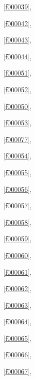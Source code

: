 \noindent\filesourcenumbernameone\ \ref{f000039},\ \pageref{f000039}%

\noindent\filesourcenumbernameone\ \ref{f000042},\ \pageref{f000042}%

\noindent\filesourcenumbernameone\ \ref{f000043},\ \pageref{f000043}%

\noindent\filesourcenumbernameone\ \ref{f000044},\ \pageref{f000044}%

\noindent\filesourcenumbernameone\ \ref{f000051},\ \pageref{f000051}%

\noindent\filesourcenumbernameone\ \ref{f000052},\ \pageref{f000052}%

\noindent\filesourcenumbernameone\ \ref{f000050},\ \pageref{f000050}%

\noindent\filesourcenumbernameone\ \ref{f000053},\ \pageref{f000053}%

\noindent\filesourcenumbernameone\ \ref{f000077},\ \pageref{f000077}%

\noindent\filesourcenumbernameone\ \ref{f000054},\ \pageref{f000054}%

\noindent\filesourcenumbernameone\ \ref{f000055},\ \pageref{f000055}%

\noindent\filesourcenumbernameone\ \ref{f000056},\ \pageref{f000056}%

\noindent\filesourcenumbernameone\ \ref{f000057},\ \pageref{f000057}%

\noindent\filesourcenumbernameone\ \ref{f000058},\ \pageref{f000058}%

\noindent\filesourcenumbernameone\ \ref{f000059},\ \pageref{f000059}%

\noindent\filesourcenumbernameone\ \ref{f000060},\ \pageref{f000060}%

\noindent\filesourcenumbernameone\ \ref{f000061},\ \pageref{f000061}%

\noindent\filesourcenumbernameone\ \ref{f000062},\ \pageref{f000062}%

\noindent\filesourcenumbernameone\ \ref{f000063},\ \pageref{f000063}%

\noindent\filesourcenumbernameone\ \ref{f000064},\ \pageref{f000064}%

\noindent\filesourcenumbernameone\ \ref{f000065},\ \pageref{f000065}%

\noindent\filesourcenumbernameone\ \ref{f000066},\ \pageref{f000066}%

\noindent\filesourcenumbernameone\ \ref{f000067},\ \pageref{f000067}%

